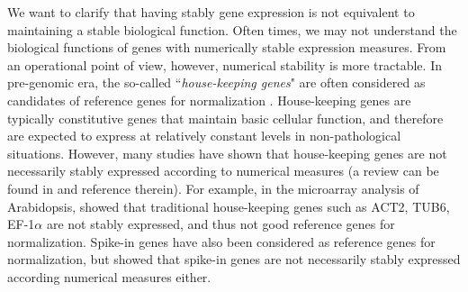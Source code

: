 	
	We want to clarify that having stably gene expression is not
	equivalent to maintaining a stable biological function.
	Often times, we may not
	understand the biological functions of genes with numerically stable
	expression measures. From an operational point of view, however, numerical
	stability is more tractable. In pre-genomic era, the so-called ``\textit{house-keeping
		genes}" are often considered as candidates of reference genes for
	normalization \citep{bustin2002quantification, andersen2004normalization}. House-keeping
	genes are typically constitutive genes that
	maintain basic cellular function, and therefore are expected to express at
	relatively constant levels in non-pathological situations.  However, many
	studies have shown that house-keeping
	genes are not necessarily stably expressed according to
	numerical measures (a review can be found in \cite{huggett2005real} and
	reference therein).  For example, in the microarray analysis of Arabidopsis, \cite{czechowski2005genome}
	showed that traditional house-keeping
	genes such as ACT2, TUB6, EF-1$\alpha$ are not stably
	expressed, and thus not good reference genes for normalization.  Spike-in
	genes  have also been considered as reference genes for normalization, but %
	\cite{risso2014nat} showed that spike-in genes are not necessarily stably
	expressed according numerical measures either.  
	
